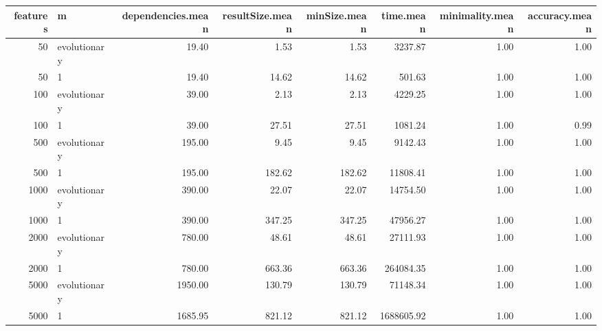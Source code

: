 \begin{table}[ht]
\centering
\begin{tabular}{rlrrrrrr}
  \hline
features & m & dependencies.mean & resultSize.mean & minSize.mean & time.mean & minimality.mean & accuracy.mean \\ 
  \hline
 50 & evolutionary & 19.40 & 1.53 & 1.53 & 3237.87 & 1.00 & 1.00 \\ 
   50 & 1 & 19.40 & 14.62 & 14.62 & 501.63 & 1.00 & 1.00 \\ 
  100 & evolutionary & 39.00 & 2.13 & 2.13 & 4229.25 & 1.00 & 1.00 \\ 
  100 & 1 & 39.00 & 27.51 & 27.51 & 1081.24 & 1.00 & 0.99 \\ 
  500 & evolutionary & 195.00 & 9.45 & 9.45 & 9142.43 & 1.00 & 1.00 \\ 
  500 & 1 & 195.00 & 182.62 & 182.62 & 11808.41 & 1.00 & 1.00 \\ 
  1000 & evolutionary & 390.00 & 22.07 & 22.07 & 14754.50 & 1.00 & 1.00 \\ 
  1000 & 1 & 390.00 & 347.25 & 347.25 & 47956.27 & 1.00 & 1.00 \\ 
  2000 & evolutionary & 780.00 & 48.61 & 48.61 & 27111.93 & 1.00 & 1.00 \\ 
  2000 & 1 & 780.00 & 663.36 & 663.36 & 264084.35 & 1.00 & 1.00 \\ 
  5000 & evolutionary & 1950.00 & 130.79 & 130.79 & 71148.34 & 1.00 & 1.00 \\ 
  5000 & 1 & 1685.95 & 821.12 & 821.12 & 1688605.92 & 1.00 & 1.00 \\ 
   \hline
\end{tabular}
\end{table}
